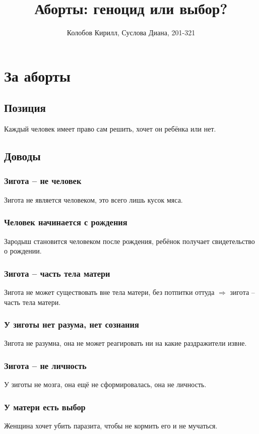 \documentclass[a4paper,12pt]{report}
\author{Колобов Кирилл, Суслова Диана, 201-321}
\date{}
\title{Аборты: геноцид или выбор?}
\begin{document}
\maketitle
\tableofcontents

\part{За аборты}
\chapter{Позиция}
    Каждый человек имеет право сам решить, хочет он ребёнка или нет.
\chapter{Доводы}
    \section{Зигота -- не человек}
        Зигота не является человеком, это всего лишь кусок мяса.
    \section{Человек начинается с рождения}
        Зародыш становится человеком после рождения, ребёнок получает свидетельство о рождении.
    \section{Зигота -- часть тела матери}
        Зигота не может существовать вне тела матери, без потпитки оттуда $\Rightarrow$ зигота -- часть тела матери.
    \section{У зиготы нет разума, нет сознания}
        Зигота не разумна, она не может реагировать ни на какие раздражители извне.
    \section{Зигота -- не личность}
        У зиготы не мозга, она ещё не сформировалась, она не личность.
    \section{У матери есть выбор}
        Женщина хочет убить паразита, чтобы не кормить его и не мучаться.
\end{document}
